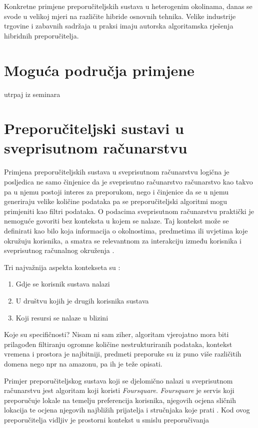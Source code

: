 \documentclass[times, utf8, diplomski, numeric]{fer}
\begin{document}
Konkretne primjene preporučiteljskih sustava u heterogenim okolinama, danas se
svode u velikoj mjeri na različite hibride osnovnih tehnika. Velike industrije
trgovine i zabavnih sadržaja u praksi imaju autorska algoritamska rješenja
hibridnih preporučitelja.
\section{Moguća područja primjene}
utrpaj iz seminara


\section{Preporučiteljski sustavi u sveprisutnom računarstvu}
Primjena preporučiteljskih sustava u sveprisutnom računarstvu logična je
posljedica ne samo činjenice da je sveprisutno računarstvo računarstvo kao takvo
pa u njemu postoji interes za preporukom, nego i činjenice da se u njemu
generiraju velike količine podataka pa se preporučiteljski algoritmi mogu
primjeniti kao filtri podataka. O podacima sveprisutnom računarstvu praktički
je nemoguće govoriti bez konteksta u kojem se nalaze. Taj kontekst može se
definirati kao bilo koja informacija o okolnostima, predmetima ili uvjetima
koje okružuju korisnika, a smatra se relevantnom za interakciju između
korisnika i sveprisutnog računalnog okruženja \cite{RanganathanCampbell}.

Tri najvažnija aspekta kontekseta su \cite{schilit1994context}:
\begin{enumerate}
  \item Gdje se korisnik sustava nalazi
  \item U društvu kojih je drugih korisnika sustava
  \item Koji resursi se nalaze u blizini
\end{enumerate}

Koje su specifičnosti? Nisam ni sam ziher, algoritam vjerojatno mora biti
prilagođen filtiranju ogromne količine nestrukturiranih podataka, kontekst
vremena i prostora je najbitniji, predmeti preporuke su iz puno više različitih
domena nego npr na amazonu, pa ih je teže opisati.

Primjer preporučiteljskog sustava koji se djelomično nalazi u sveprisutnom
računarstvu jest algoritam koji koristi \emph{Foursquare}. \emph{Foursquare} je
servis koji preporučuje lokale na temelju preferencija korisnika, njegovih
ocjena sličnih lokacija te ocjena njegovih najbližih prijatelja i stručnjaka
koje prati \cite{FoursquareAbout}. Kod ovog preporučitelja vidljiv je prostorni
kontekst u smislu preporučivanja
\end{document}
